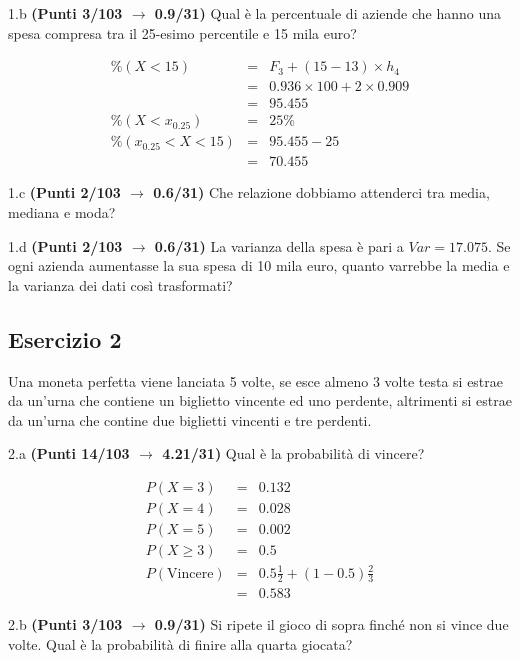 \documentclass[
  11pt,
]{book}
\theoremstyle{mytheoremstyle}
\theoremstyle{mydefstyle}
\newenvironment{sol}
  {
  \begin{tcolorbox}[enhanced,breakable,arc=0.1mm,boxrule=1pt,colback=white,colframe=iblue,
  title=\bf \fontfamily{lmss}\selectfont \hspace{.5 cm} Soluzione,drop fuzzy shadow]

}{
\end{tcolorbox}
  }
\begin{document}
1.b \textbf{(Punti 3/103 \(\rightarrow\) 0.9/31)} Qual è la percentuale di aziende che hanno una spesa
compresa tra il 25-esimo percentile e 15 mila euro?

\begin{sol}
\begin{eqnarray*}
  \%(X<15) &=&  F_3+(15-13)\times h_4\\
  &=& 0.936\times 100+2\times 0.909\\
  &=& 95.455\\
  \%(X<x_{0.25}) &=&  25\%\\
  \%(x_{0.25}<X<15)&=& 95.455-25\\
  &=& 70.455
\end{eqnarray*}

\end{sol}

1.c \textbf{(Punti 2/103 \(\rightarrow\) 0.6/31)} Che relazione dobbiamo attenderci tra media, mediana e moda?

1.d \textbf{(Punti 2/103 \(\rightarrow\) 0.6/31)} La varianza della spesa è pari a \(Var=17.075\).
Se ogni azienda aumentasse la sua spesa di 10 mila euro, quanto varrebbe la media e la varianza dei dati così trasformati?

\subsection{Esercizio 2}\label{esercizio-2-16}

Una moneta perfetta viene lanciata 5 volte, se esce almeno 3 volte testa si estrae da un'urna che contiene
un biglietto vincente ed uno perdente, altrimenti si estrae da un'urna che contine due biglietti vincenti e tre perdenti.

2.a \textbf{(Punti 14/103 \(\rightarrow\) 4.21/31)} Qual è la probabilità di vincere?

\begin{sol}
\begin{eqnarray*}
  P(X=3) &=& 0.132\\
  P(X=4) &=& 0.028\\
  P(X=5) &=& 0.002\\
  P(X\ge 3)  &=& 0.5\\
  P(\text{Vincere})&=& 0.5\frac12+(1-0.5)\frac23\\
  &=& 0.583
\end{eqnarray*}

\end{sol}

2.b \textbf{(Punti 3/103 \(\rightarrow\) 0.9/31)} Si ripete il gioco di sopra finché non si vince due volte. Qual è la probabilità di finire alla quarta giocata?
\end{document}
